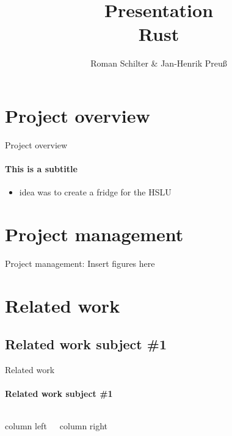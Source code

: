 \documentclass[aspectratio=169, professionalfonts]{beamer}
\title[PCP-Rust]{Presentation\\ Rust}
\author[Schilter \& Preuß]{Roman Schilter \& Jan-Henrik Preuß}
\begin{document}
    \typesetFrontSlides




    \section{Project overview}


    \begin{frame}{Project overview}
        \framesubtitle{This is a subtitle}
        \begin{itemize}
            \item idea was to create a fridge for the HSLU
        \end{itemize}

    \end{frame}



    \section{Project management}


    \begin{frame}{Project management:}
        Insert figures here

    \end{frame}



    \section{Related work}


    \subsection{Related work subject \#1}

    \begin{frame}{Related work}
        \framesubtitle{Related work subject \#1}
        \begin{columns}[T]

            column left

            column right
        \end{columns}


    \end{frame}
\end{document}

